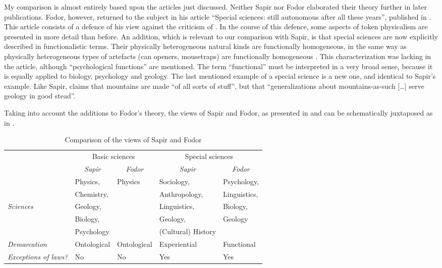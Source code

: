\documentclass[output=paper]{langscibook}
\begin{document}
My comparison is almost entirely based upon the articles just discussed. Neither Sapir nor Fodor elaborated their theory further in later publications. Fodor, however, returned to the subject in his article ``Special sciences: still autonomous after all these years'', published in \citeyear{Fodor1997}. This article consists of a defence of his view against the criticism of \citet{Kim1992}. In the course of this defence, some aspects of token physicalism are presented in more detail than before. An addition, which is relevant to our comparison with Sapir, is that special sciences are now explicitly described in functionalistic terms. Their physically heterogeneous natural kinds are functionally homogeneous, in the same way as physically heterogeneous types of artefacts (can openers, mousetraps) are functionally homogeneous \citet[160]{Fodor1997}. This characterization was lacking in the \citeyear{Fodor1974} article, although ``psychological functions'' are mentioned. The term ``functional'' must be interpreted in a very broad sense, because it is equally applied to biology, psychology and geology. The last mentioned example of a special science is a new one, and identical to Sapir's example. Like Sapir, \citet[160]{Fodor1997} claims that mountains are made ``of all sorts of stuff'', but that ``generalizations about mountains-as-such […] serve geology in good stead''.

Taking into account the \citeyear{Fodor1997} additions to Fodor's theory, the views of Sapir and Fodor, as presented in  and  can be schematically juxtaposed as in .

\begin{table}
\begin{tabular}{p{1.8cm} p{2.2cm} p{2.2cm} p{2.2cm} p{2.2cm}}
  \multirow{2}{*}{ } & \multicolumn{2}{c}{Basic sciences} & \multicolumn{2}{c}{Special sciences} \\
  & \multicolumn{1}{c}{\emph{Sapir}} & \multicolumn{1}{c}{\emph{Fodor}} & \multicolumn{1}{c}{\emph{Sapir}} & \multicolumn{1}{c}{\emph{Fodor}} \\ \midrule
  & Physics, & Physics & Sociology, & Psychology, \\
  & Chemistry, & & Anthropology, & Linguistics, \\
  \emph{Sciences} & Geology, & & Linguistics, & Biology, \\
  & Biology, & & Geology, & Geology  \\
  & Psychology & & {(}Cultural{)} History & \\ \midrule
 
 \emph{Demarcation} & Ontological & Ontological & Experiential & Functional \\ \midrule
 
 \emph{Exceptions of laws?} & No & No & Yes & Yes \\
\end{tabular}
\caption{Comparison of the views of Sapir and Fodor}
\label{tab:elffers:sciences}
\end{table}
\end{document}
